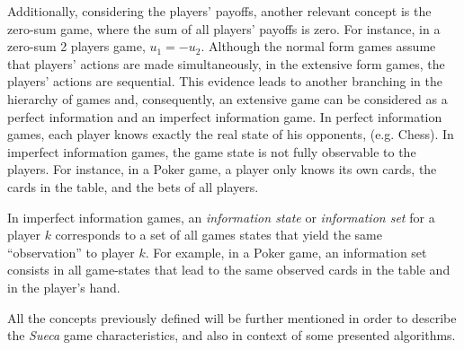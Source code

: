 Additionally, considering the players' payoffs, another relevant concept is the zero-sum game, where the sum of all players' payoffs is zero.
For instance, in a zero-sum 2 players game, $u_1 = -u_2$.
Although the normal form games assume that players' actions are made simultaneously, in the extensive form games, the players' actions are sequential.
This evidence leads to another branching in the hierarchy of games and, consequently, an extensive game can be considered as a perfect information and an imperfect information game.
In perfect information games, each player knows exactly the real state of his opponents, (e.g. Chess).
In imperfect information games, the game state is not fully observable to the players. For instance, in a Poker game, a player only knows its own cards, the cards in the table, and the bets of all players.

In imperfect information games, an \emph{information state} or \emph{information set} for a player $k$ corresponds to a set of all games states that yield the same “observation” to player $k$. For example, in a Poker game, an information set consists in all game-states that lead to the same observed cards in the table and in the player’s hand.

All the concepts previously defined will be further mentioned in order to describe the \emph{Sueca} game characteristics, and also in context of some presented algorithms.



